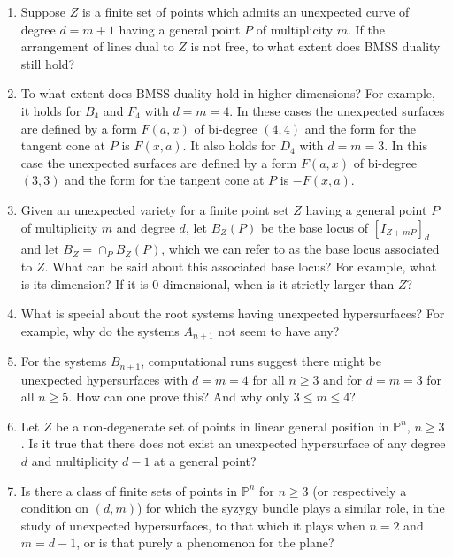 \documentclass[12pt]{amsart}
\numberwithin{equation}{section}
\theoremstyle{definition}
\newcommand{\PP}{ \ensuremath{\mathbb{P}}}
\begin{document}
\begin{enumerate}

\item Suppose $Z$ is a finite set of points which admits an unexpected curve of degree $d=m+1$ having a general point 
$P$ of multiplicity $m$. If the arrangement of lines dual to $Z$ is not free, to what extent does BMSS duality still hold? 

\item  To what extent does BMSS duality hold in higher dimensions? 
For example, it holds for $B_4$ and $F_4$ with $d=m=4$. In these cases the unexpected surfaces are defined by a form 
$F(a,x)$ of bi-degree $(4,4)$ and the form for the tangent cone at $P$ is $F(x,a)$.
It also holds for $D_4$ with $d=m=3$. In this case the unexpected surfaces are defined by a form $F(a,x)$ of bi-degree 
$(3,3)$ and the form for the tangent cone at $P$ is $-F(x,a)$. 

\item  Given an unexpected variety for a finite point set $Z$ having a general point $P$ of multiplicity $m$ and degree $d$, 
let $B_Z(P)$ be the base locus of $[I_{Z+mP}]_d$ and let $B_Z=\cap_P B_Z(P)$, which we can refer to as the base locus associated 
to $Z$. What can be said about this associated base locus? For example, what is its dimension? If it is 0-dimensional, when is it strictly larger than $Z$?

\item  What is special about the root systems having unexpected hypersurfaces? For example, why do the systems $A_{n+1}$ not seem to have any?

\item  For the systems $B_{n+1}$, computational runs suggest there might be unexpected hypersurfaces with $d=m=4$ for all $n\geq 3$ and for $d=m=3$ for all $n\geq5$. How can one prove this? And why only $3\leq m\leq 4$?

\item Let $Z$ be a non-degenerate set of points in linear general position in $\PP^n$, $n \geq 3$. Is it true that there does not exist an unexpected hypersurface of any degree $d$ and multiplicity $d-1$ at a general point?

\item Is there a class of finite sets of points in $\PP^n$ for $n \geq 3$ (or respectively a condition on $(d,m)$) for which the syzygy 
bundle plays a similar role, in the study of unexpected hypersurfaces, to that which it plays when $n=2$ and $m = d-1$, or is that purely a phenomenon for the plane?


\end{enumerate}
\end{document}
